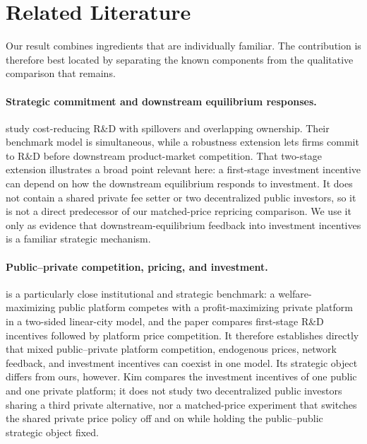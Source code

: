 \section{Related Literature}\label{sec:literature}

Our result combines ingredients that are individually familiar. The contribution is therefore best located by separating the known components from the qualitative comparison that remains.

\paragraph{Strategic commitment and downstream equilibrium responses.}
\citet{LopezVives2019} study cost-reducing R\&D with spillovers and overlapping ownership. Their benchmark model is simultaneous, while a robustness extension lets firms commit to R\&D before downstream product-market competition. That two-stage extension illustrates a broad point relevant here: a first-stage investment incentive can depend on how the downstream equilibrium responds to investment. It does not contain a shared private fee setter or two decentralized public investors, so it is not a direct predecessor of our matched-price repricing comparison. We use it only as evidence that downstream-equilibrium feedback into investment incentives is a familiar strategic mechanism.

\paragraph{Public--private competition, pricing, and investment.}
\citet{Kim2024MixedDuopoly} is a particularly close institutional and strategic benchmark: a welfare-maximizing public platform competes with a profit-maximizing private platform in a two-sided linear-city model, and the paper compares first-stage R\&D incentives followed by platform price competition. It therefore establishes directly that mixed public--private platform competition, endogenous prices, network feedback, and investment incentives can coexist in one model. Its strategic object differs from ours, however. Kim compares the investment incentives of one public and one private platform; it does not study two decentralized public investors sharing a third private alternative, nor a matched-price experiment that switches the shared private price policy off and on while holding the public--public strategic object fixed.

